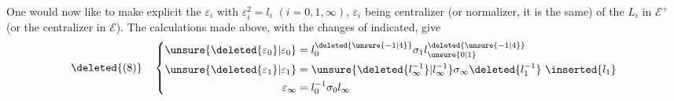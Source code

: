 One would now like to make explicit the $\varepsilon_i$ with $\varepsilon_i^2=l_i$ $(i=0,1,\infty)$, $\varepsilon_i$ being    centralizer (or normalizer, it is the same) of the $L_i$ in $\mathcal E^+$ (or the centralizer in $\mathcal E$). The calculations made above, with the changes of  indicated, give
\[
\deleted{(8)}\quad\left\{\begin{aligned}
\unsure{\deleted{\varepsilon_0}|\varepsilon_0}&=l_0^{\deleted{\unsure{-1|4}}}\sigma_1 l_{\unsure{0|1}}^{\deleted{\unsure{-1|4}}}\\
\unsure{\deleted{\varepsilon_1}|\varepsilon_1}&=\unsure{\deleted{l_\infty^{-1}}|l_\infty^{-1}}\sigma_\infty \deleted{l_1^{-1}}\ \inserted{l_1}\\
\varepsilon_\infty&=l_0^{-1}\sigma_0 l_\infty
\end{aligned}\right.
\]
